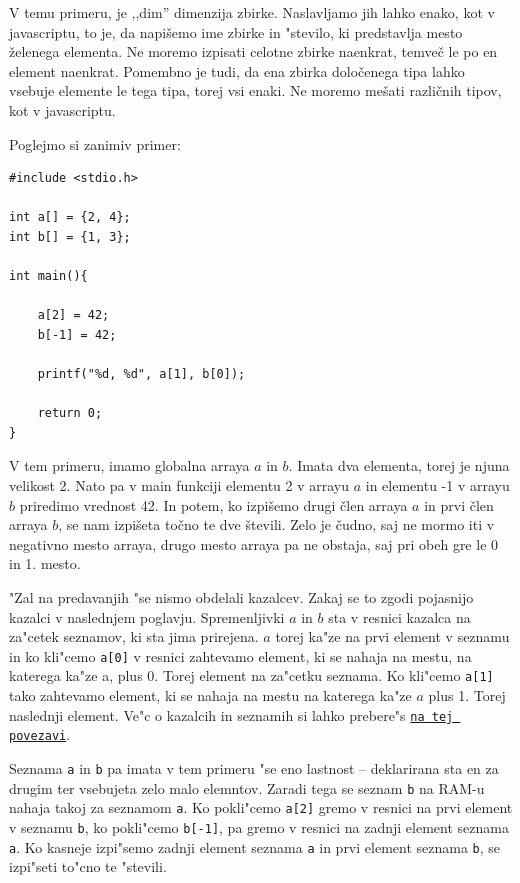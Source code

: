 \documentclass[a4paper, 12pt]{article}
\begin{document}
V temu primeru, je ,,dim'' dimenzija zbirke. Naslavljamo jih lahko enako, kot v javascriptu, to je, da napišemo ime zbirke in "stevilo, ki predstavlja mesto želenega elementa. Ne moremo izpisati celotne zbirke naenkrat, temveč le po en element naenkrat. Pomembno je tudi, da ena zbirka določenega tipa lahko vsebuje elemente le tega tipa, torej vsi enaki. Ne moremo mešati različnih tipov, kot v javascriptu.

Poglejmo si zanimiv primer:

\begin{lstlisting}
#include <stdio.h>

int a[] = {2, 4};
int b[] = {1, 3};

int main(){

	a[2] = 42;
	b[-1] = 42;

	printf("%d, %d", a[1], b[0]);

	return 0;
}
\end{lstlisting}

V tem primeru, imamo globalna arraya $a$ in $b$. Imata dva elementa, torej je njuna velikost 2. Nato pa v main funkciji elementu 2 v arrayu $a$ in elementu -1 v arrayu $b$ priredimo vrednost 42. In potem, ko izpišemo drugi člen arraya $a$ in prvi člen arraya $b$, se nam izpišeta točno te dve števili. Zelo je čudno, saj ne mormo iti v negativno mesto arraya, drugo mesto arraya pa ne obstaja, saj pri obeh gre le 0 in 1. mesto.

"Zal na predavanjih "se nismo obdelali kazalcev. Zakaj se to zgodi pojasnijo kazalci v naslednjem poglavju. Spremenljivki $a$ in $b$ sta v resnici kazalca na za"cetek seznamov, ki sta jima prirejena. $a$ torej ka"ze na prvi element v seznamu in ko kli"cemo \lstinline|a[0]| v resnici zahtevamo element, ki se nahaja na mestu, na katerega ka"ze a, plus 0. Torej element na za"cetku seznama. Ko kli"cemo \lstinline|a[1]| tako zahtevamo element, ki se nahaja na mestu na katerega ka"ze $a$ plus 1. Torej naslednji element. Ve"c o kazalcih in seznamih si lahko prebere"s  \href{https://github.com/DzinVision/c-uvod}{\texttt{na tej povezavi}}.

Seznama  \lstinline|a| in \lstinline|b| pa imata v tem primeru "se eno lastnost -- deklarirana sta en za drugim ter vsebujeta zelo malo elemntov. Zaradi tega se seznam \lstinline|b| na RAM-u nahaja takoj za seznamom \lstinline|a|. Ko pokli"cemo \lstinline|a[2]| gremo v resnici na prvi element v seznamu \texttt{b}, ko pokli"cemo \lstinline|b[-1]|, pa gremo v resnici na zadnji element seznama \texttt{a}. Ko kasneje izpi"semo zadnji element seznama \texttt{a} in prvi element seznama \texttt{b}, se izpi"seti to"cno te "stevili. 
\end{document}
